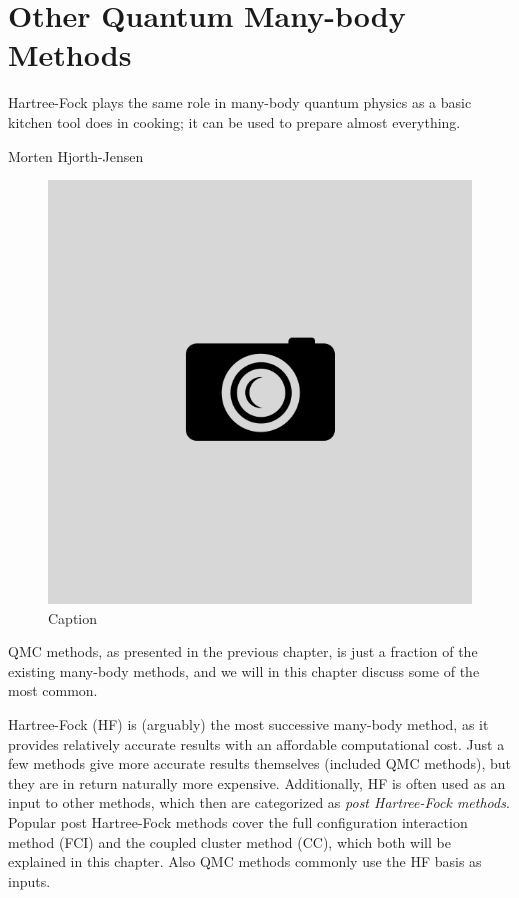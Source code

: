\chapter{Other Quantum Many-body Methods} \label{chp:othermethods}
\epigraph{Hartree-Fock plays the same role in many-body quantum physics as a basic kitchen tool does in cooking; it can be used to prepare almost everything.}{Morten Hjorth-Jensen}
\begin{figure}[H]
	\centering
	\includegraphics[scale=0.4]{Images/example.png}
	\caption{Caption}
\end{figure}

QMC methods, as presented in the previous chapter, is just a fraction of the existing many-body methods, and we will in this chapter discuss some of the most common. 

Hartree-Fock (HF) is (arguably) the most successive many-body method, as it provides relatively accurate results with an affordable computational cost. Just a few methods give more accurate results themselves (included QMC methods), but they are in return naturally more expensive. Additionally, HF is often used as an input to other methods, which then are categorized as \textit{post Hartree-Fock methods}. Popular post Hartree-Fock methods cover the full configuration interaction method (FCI) and the coupled cluster method (CC), which both will be explained in this chapter. Also QMC methods commonly use the HF basis as inputs.

